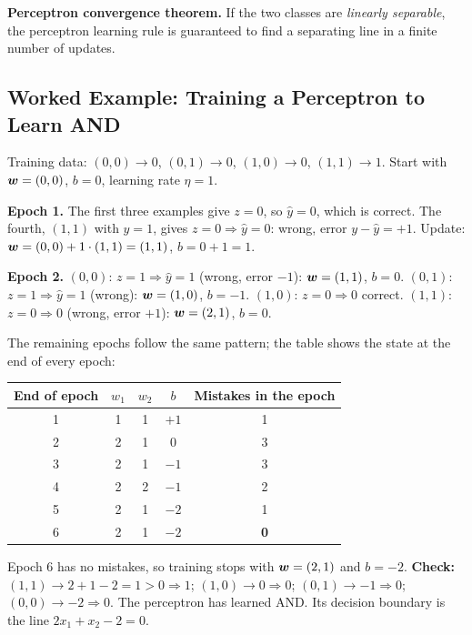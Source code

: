 \textbf{Perceptron convergence theorem.} If the two classes are \emph{linearly separable}, the perceptron learning rule is guaranteed to find a separating line in a finite number of updates.

\subsection{Worked Example: Training a Perceptron to Learn AND}

\begin{example}
Training data: $(0,0)\to0$, $(0,1)\to0$, $(1,0)\to0$, $(1,1)\to1$. Start with $\boldsymbol{w}=(0,0)$, $b=0$, learning rate $\eta=1$.

\medskip
\textbf{Epoch 1.} The first three examples give $z=0$, so $\hat y=0$, which is correct. The fourth, $(1,1)$ with $y=1$, gives $z=0\Rightarrow\hat y=0$: wrong, error $y-\hat y=+1$. Update: $\boldsymbol{w}=(0,0)+1\cdot(1,1)=(1,1)$, $b=0+1=1$.

\medskip
\textbf{Epoch 2.} $(0,0)$: $z=1\Rightarrow\hat y=1$ (wrong, error $-1$): $\boldsymbol{w}=(1,1)$, $b=0$. $(0,1)$: $z=1\Rightarrow\hat y=1$ (wrong): $\boldsymbol{w}=(1,0)$, $b=-1$. $(1,0)$: $z=0\Rightarrow0$ correct. $(1,1)$: $z=0\Rightarrow0$ (wrong, error $+1$): $\boldsymbol{w}=(2,1)$, $b=0$.

\medskip
The remaining epochs follow the same pattern; the table shows the state at the end of every epoch:

\begin{center}
\begin{tabular}{@{}c|ccc|c@{}}
\toprule
End of epoch & $w_1$ & $w_2$ & $b$ & Mistakes in the epoch\\
\midrule
1 & 1 & 1 & $+1$ & 1\\
2 & 2 & 1 & $0$ & 3\\
3 & 2 & 1 & $-1$ & 3\\
4 & 2 & 2 & $-1$ & 2\\
5 & 2 & 1 & $-2$ & 1\\
6 & 2 & 1 & $-2$ & \textbf{0}\\
\bottomrule
\end{tabular}
\end{center}

Epoch 6 has no mistakes, so training stops with $\boldsymbol{w}=(2,1)$ and $b=-2$. \textbf{Check:} $(1,1)\to2+1-2=1>0\Rightarrow1$; $(1,0)\to0\Rightarrow0$; $(0,1)\to-1\Rightarrow0$; $(0,0)\to-2\Rightarrow0$. The perceptron has learned AND. Its decision boundary is the line $2x_1+x_2-2=0$.
\end{example}

